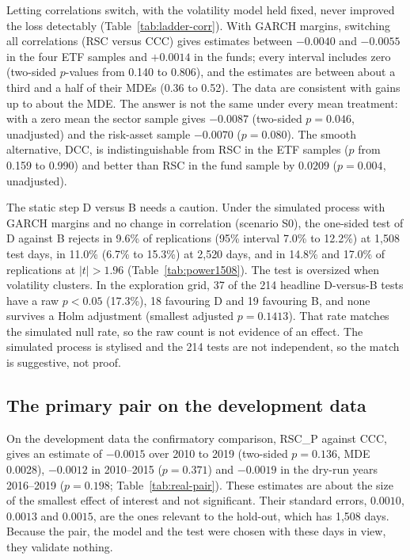 Letting correlations switch, with the volatility model held fixed, never improved the loss detectably (Table~\ref{tab:ladder-corr}). With GARCH margins, switching all correlations (RSC versus CCC) gives estimates between $-0.0040$ and $-0.0055$ in the four ETF samples and $+0.0014$ in the funds; every interval includes zero (two-sided $p$-values from 0.140 to 0.806), and the estimates are between about a third and a half of their MDEs (0.36 to 0.52). The data are consistent with gains up to about the MDE. The answer is not the same under every mean treatment: with a zero mean the sector sample gives $-0.0087$ (two-sided $p=0.046$, unadjusted) and the risk-asset sample $-0.0070$ ($p=0.080$). The smooth alternative, DCC, is indistinguishable from RSC in the ETF samples ($p$ from 0.159 to 0.990) and better than RSC in the fund sample by $0.0209$ ($p=0.004$, unadjusted).



The static step D versus B needs a caution. Under the simulated process with GARCH margins and no change in correlation (scenario S0), the one-sided test of D against B rejects in 9.6\% of replications (95\% interval 7.0\% to 12.2\%) at 1,508 test days, in 11.0\% (6.7\% to 15.3\%) at 2,520 days, and in 14.8\% and 17.0\% of replications at $|t|>1.96$ (Table~\ref{tab:power1508}). The test is oversized when volatility clusters. In the exploration grid, 37 of the 214 headline D-versus-B tests have a raw $p<0.05$ (17.3\%), 18 favouring D and 19 favouring B, and none survives a Holm adjustment (smallest adjusted $p=0.1413$). That rate matches the simulated null rate, so the raw count is not evidence of an effect. The simulated process is stylised and the 214 tests are not independent, so the match is suggestive, not proof.

\subsection{The primary pair on the development data}\label{sec:pair-dev}

On the development data the confirmatory comparison, RSC\_P against CCC, gives an estimate of $-0.0015$ over 2010 to 2019 (two-sided $p=0.136$, MDE 0.0028), $-0.0012$ in 2010--2015 ($p=0.371$) and $-0.0019$ in the dry-run years 2016--2019 ($p=0.198$; Table~\ref{tab:real-pair}). These estimates are about the size of the smallest effect of interest and not significant. Their standard errors, $0.0010$, $0.0013$ and $0.0015$, are the ones relevant to the hold-out, which has 1,508 days. Because the pair, the model and the test were chosen with these days in view, they validate nothing.

